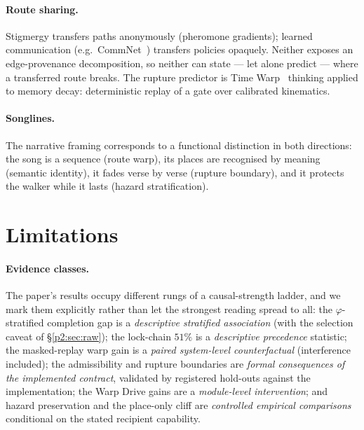 \documentclass{article}
\begin{document}
\paragraph{Route sharing.} Stigmergy transfers paths anonymously
(pheromone gradients); learned communication (e.g.\
CommNet~\cite{sukhbaatar2016commnet}) transfers policies opaquely.
Neither exposes an edge-provenance decomposition, so neither can
state --- let alone predict --- where a transferred route breaks.
The rupture predictor is Time Warp~\cite{jefferson1985} thinking
applied to memory decay: deterministic replay of a gate over
calibrated kinematics.
\paragraph{Songlines.} The narrative framing corresponds to a functional distinction in
both directions: the song is a sequence (route warp), its places are
recognised by meaning (semantic identity), it fades verse by verse
(rupture boundary), and it protects the walker while it lasts (hazard
stratification).


\section{Limitations}
\label{p2:sec:limits}

\paragraph{Evidence classes.} The paper's results occupy different
rungs of a causal-strength ladder, and we mark them explicitly rather
than let the strongest reading spread to all: the $\varphi$-stratified
completion gap is a \emph{descriptive stratified association} (with
the selection caveat of \S\ref{p2:sec:raw}); the lock-chain $51\%$ is
a \emph{descriptive precedence} statistic; the masked-replay warp gain
is a \emph{paired system-level counterfactual} (interference
included); the admissibility and rupture boundaries are \emph{formal
consequences of the implemented contract}, validated by registered
hold-outs against the implementation; the Warp Drive gains are a
\emph{module-level intervention}; and hazard preservation and the
place-only cliff are \emph{controlled empirical comparisons}
conditional on the stated recipient capability.
\end{document}

